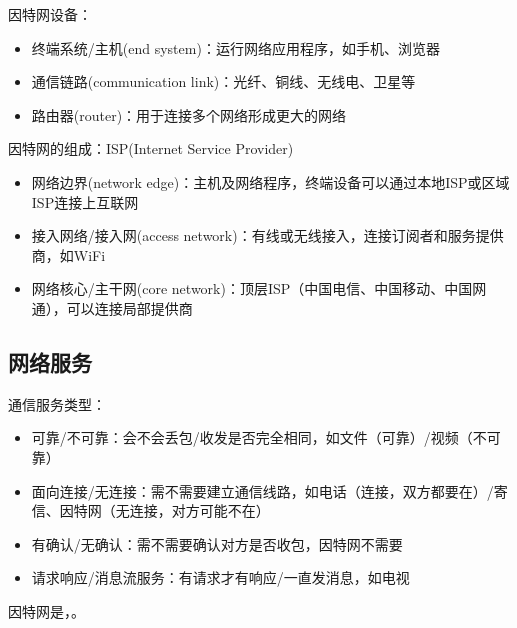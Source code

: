 \myhline
因特网设备：
\begin{itemize}
	\item 终端系统/主机(end system)：运行网络应用程序，如手机、浏览器
	\item 通信链路(communication link)：光纤、铜线、无线电、卫星等
	\item 路由器(router)：用于连接多个网络形成更大的网络
\end{itemize}

\myhline
因特网的组成：ISP(Internet Service Provider)
\begin{itemize}
	\item 网络边界(network edge)：主机及网络程序，终端设备可以通过本地ISP或区域ISP连接上互联网
	\item 接入网络/接入网(access network)：有线或无线接入，连接订阅者和服务提供商，如WiFi
	\item 网络核心/主干网(core network)：顶层ISP（中国电信、中国移动、中国网通），可以连接局部提供商
\end{itemize}

\subsection{网络服务}
通信服务类型：
\begin{itemize}
	\item 可靠/不可靠：会不会丢包/收发是否完全相同，如文件（可靠）/视频（不可靠）
	\item 面向连接/无连接：需不需要建立通信线路，如电话（连接，双方都要在）/寄信、因特网（无连接，对方可能不在）
	\item 有确认/无确认：需不需要确认对方是否收包，因特网不需要
	\item 请求响应/消息流服务：有请求才有响应/一直发消息，如电视
\end{itemize}

因特网是，。

